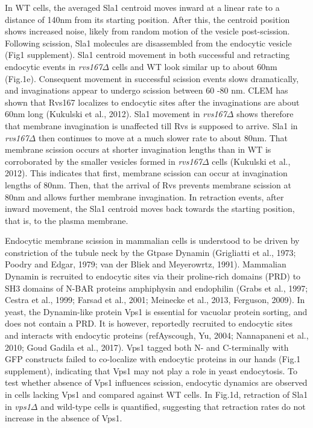 \documentclass[9pt,lineno]{elife}
\begin{document}
In WT cells, the averaged Sla1 centroid moves inward at a linear rate to a distance of 140nm from its starting position. After this, the centroid position shows increased noise, likely from random motion of the vesicle post-scission. Following scission, Sla1 molecules are disassembled from the endocytic vesicle (Fig1 supplement). Sla1 centroid movement in both successful and retracting endocytic events in \textit{rvs167$\Delta$} cells and WT look similar up to about 60nm (Fig.1e).  Consequent movement in successful scission events slows dramatically, and invaginations appear to undergo scission between 60 -80 nm. CLEM has shown that Rvs167 localizes to endocytic sites after the invaginations are about 60nm long (Kukulski et al., 2012). Sla1 movement in \textit{rvs167$\Delta$}  shows therefore that membrane invagination is unaffected till Rvs is supposed to arrive. Sla1 in \textit{rvs167$\Delta$}  then continues to move at a much slower rate to about 80nm. That membrane scission occurs at shorter invagination lengths than in WT is corroborated by the smaller vesicles formed in \textit{rvs167$\Delta$} cells (Kukulski et al., 2012). This indicates that first, membrane scission can occur at invagination lengths of 80nm. Then, that the arrival of Rvs prevents membrane scission at 80nm and allows further membrane invagination. In retraction events, after inward movement, the Sla1 centroid moves back towards the starting position, that is, to the plasma membrane. 

Endocytic membrane scission in mammalian cells is understood to be driven by constriction of the tubule neck by the Gtpase Dynamin (Grigliatti et al., 1973; Poodry and Edgar, 1979; van der Bliek and Meyerowrtz, 1991). Mammalian Dynamin is recruited to endocytic sites via their proline-rich domains (PRD) to SH3 domains of N-BAR proteins amphiphysin and endophilin (Grabs et al., 1997; Cestra et al., 1999; Farsad et al., 2001; Meinecke et al., 2013, Ferguson, 2009). In yeast, the Dynamin-like protein Vps1 is essential for vacuolar protein sorting, and does not contain a PRD. It is however, reportedly recruited to endocytic sites and interacts with endocytic proteins (refAyscough, Yu, 2004; Nannapaneni et al., 2010; Goud Gadila et al., 2017). Vps1 tagged both N- and C-terminally with GFP constructs failed to co-localize with endocytic proteins in our hands (Fig.1 supplement), indicating that Vps1 may not play a role in yeast endocytosis. To test whether absence of Vps1 influences scission, endocytic dynamics are observed in cells lacking Vps1 and compared against WT cells. In Fig.1d, retraction of Sla1 in \textit{vps1$\Delta$} and wild-type cells is quantified, suggesting that retraction rates do not increase in the absence of Vps1. 
\end{document}
